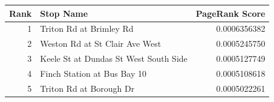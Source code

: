 \begin{tabular}{r l r}
\toprule
Rank & Stop Name & PageRank Score \\
\midrule
1 & Triton Rd at Brimley Rd & 0.0006356382 \\
2 & Weston Rd at St Clair Ave West & 0.0005245750 \\
3 & Keele St at Dundas St West South Side & 0.0005127749 \\
4 & Finch Station at Bus Bay 10 & 0.0005108618 \\
5 & Triton Rd at Borough Dr & 0.0005022261 \\
\bottomrule
\end{tabular}
